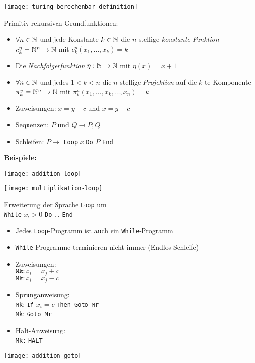
\texttt{[image: turing-berechenbar-definition]}


Primitiv rekursiven Grundfunktionen:
\begin{itemize}
    \item $\forall n \in \mathbb{N}$ und jede Konstante $k \in \mathbb{N}$ die $n$-stellige \emph{konstante Funktion}\\ $c_k^n = \mathbb{N}^n \rightarrow \mathbb{N}$ mit $c_k^n (x_1, \dots, x_k) = k$
    \item Die \emph{Nachfolgerfunktion} $\eta: \mathbb{N} \rightarrow \mathbb{N}$ mit $\eta(x) = x + 1$
    \item $\forall n \in \mathbb{N}$ und jedes $1 < k < n$ die $n$-stellige \emph{Projektion} auf die $k$-te Komponente $\pi_k^n = \mathbb{N}^n \rightarrow \mathbb{N}$ mit $\pi_k^n (x_1, \dots, x_k, \dots, x_n) = k$
\end{itemize}


\begin{itemize}
    \item Zuweisungen: $x = y + c$ und $x = y - c$
    \item Sequenzen: $P$ und $Q \rightarrow P;Q$
    \item Schleifen: $P \rightarrow$ \texttt{Loop} $x$ \texttt{Do} $P$ \texttt{End}
\end{itemize}

\textbf{Beispiele:}

\texttt{[image: addition-loop]}

\texttt{[image: multiplikation-loop]}

\columnbreak


Erweiterung der Sprache \texttt{Loop} um\\
\texttt{While} $x_i > 0$ \texttt{Do} $\dots$ \texttt{End}
\begin{itemize}
    \item Jedes \texttt{Loop}-Programm ist auch ein \texttt{While}-Programm
    \item \texttt{While}-Programme terminieren nicht immer (Endlos-Schleife)
\end{itemize}


\begin{itemize}
    \item Zuweisungen:\\
    $\texttt{Mk}: x_i = x_j + c$ \\
    $\texttt{Mk}: x_i = x_j - c$
    \item Sprunganweisung:\\
    \texttt{Mk}: \texttt{If} $x_i = c$ \texttt{Then Goto Mr} \\
    \texttt{Mk}: \texttt{Goto Mr}
    \item Halt-Anweisung:\\
    \texttt{Mk:} \texttt{HALT}
\end{itemize}

\texttt{[image: addition-goto]}%